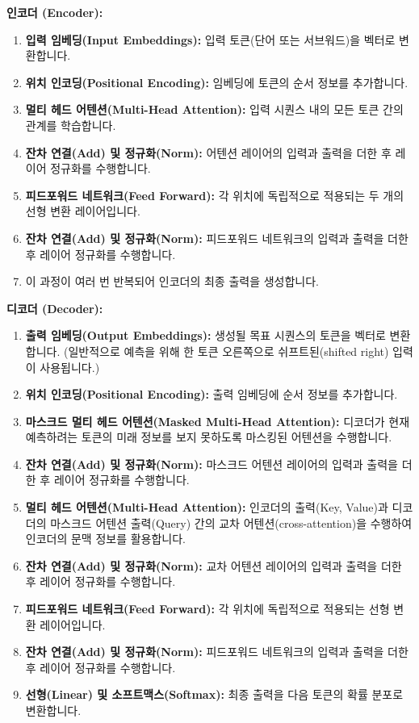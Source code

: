 \documentclass[11pt,a4paper]{article}
\theoremstyle{definition}
\begin{document}
\begin{tcolorbox}[title={트랜스포머 아키텍처의 주요 흐름 (개념도 설명)}, colback=white, colframe=black]
\textbf{인코더 (Encoder):}
\begin{enumerate}
    \item \textbf{입력 임베딩(Input Embeddings):} 입력 토큰(단어 또는 서브워드)을 벡터로 변환합니다.
    \item \textbf{위치 인코딩(Positional Encoding):} 임베딩에 토큰의 순서 정보를 추가합니다.
    \item \textbf{멀티 헤드 어텐션(Multi-Head Attention):} 입력 시퀀스 내의 모든 토큰 간의 관계를 학습합니다.
    \item \textbf{잔차 연결(Add) 및 정규화(Norm):} 어텐션 레이어의 입력과 출력을 더한 후 레이어 정규화를 수행합니다.
    \item \textbf{피드포워드 네트워크(Feed Forward):} 각 위치에 독립적으로 적용되는 두 개의 선형 변환 레이어입니다.
    \item \textbf{잔차 연결(Add) 및 정규화(Norm):} 피드포워드 네트워크의 입력과 출력을 더한 후 레이어 정규화를 수행합니다.
    \item 이 과정이 여러 번 반복되어 인코더의 최종 출력을 생성합니다.
\end{enumerate}

\textbf{디코더 (Decoder):}
\begin{enumerate}
    \item \textbf{출력 임베딩(Output Embeddings):} 생성될 목표 시퀀스의 토큰을 벡터로 변환합니다. (일반적으로 예측을 위해 한 토큰 오른쪽으로 쉬프트된(shifted right) 입력이 사용됩니다.)
    \item \textbf{위치 인코딩(Positional Encoding):} 출력 임베딩에 순서 정보를 추가합니다.
    \item \textbf{마스크드 멀티 헤드 어텐션(Masked Multi-Head Attention):} 디코더가 현재 예측하려는 토큰의 미래 정보를 보지 못하도록 마스킹된 어텐션을 수행합니다.
    \item \textbf{잔차 연결(Add) 및 정규화(Norm):} 마스크드 어텐션 레이어의 입력과 출력을 더한 후 레이어 정규화를 수행합니다.
    \item \textbf{멀티 헤드 어텐션(Multi-Head Attention):} 인코더의 출력(Key, Value)과 디코더의 마스크드 어텐션 출력(Query) 간의 교차 어텐션(cross-attention)을 수행하여 인코더의 문맥 정보를 활용합니다.
    \item \textbf{잔차 연결(Add) 및 정규화(Norm):} 교차 어텐션 레이어의 입력과 출력을 더한 후 레이어 정규화를 수행합니다.
    \item \textbf{피드포워드 네트워크(Feed Forward):} 각 위치에 독립적으로 적용되는 선형 변환 레이어입니다.
    \item \textbf{잔차 연결(Add) 및 정규화(Norm):} 피드포워드 네트워크의 입력과 출력을 더한 후 레이어 정규화를 수행합니다.
    \item \textbf{선형(Linear) 및 소프트맥스(Softmax):} 최종 출력을 다음 토큰의 확률 분포로 변환합니다.
\end{enumerate}
\end{tcolorbox}
\end{document}
